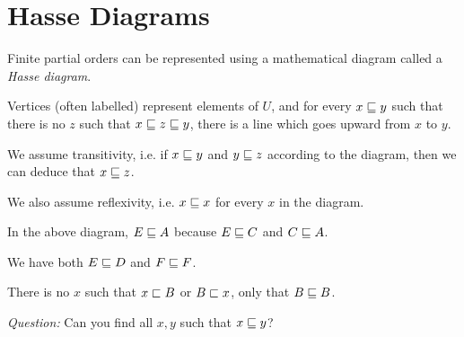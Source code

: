 \section{Hasse Diagrams}
Finite partial orders can be represented using a mathematical diagram called a \emph{Hasse diagram}.

Vertices (often labelled) represent elements of $U$, and for every $x\sqsubseteq{}y$
such that there is no $z$ such that $x\sqsubseteq{}z\sqsubseteq{}y$, there is a line which
goes upward from $x$ to $y$.

We assume transitivity, i.e. if $x\sqsubseteq{}y$ and $y\sqsubseteq{}z$ according to the diagram, then we can deduce that $x\sqsubseteq{}z$.

We also assume reflexivity, i.e. $x \sqsubseteq{} x$ for every $x$ in the diagram.

\begin{center}
\end{center}

In the above diagram, $E \sqsubseteq{} A$ because $E \sqsubseteq{} C$ and $C \sqsubseteq{} A$.

We have both $E \sqsubseteq{} D$ and $F \sqsubseteq{} F$.

There is no $x$ such that $x \sqsubset{} B$ or $B \sqsubset{} x$, only that $B \sqsubseteq{} B$.

\emph{Question:} Can you find all $x,y$ such that $x \sqsubseteq y$?


